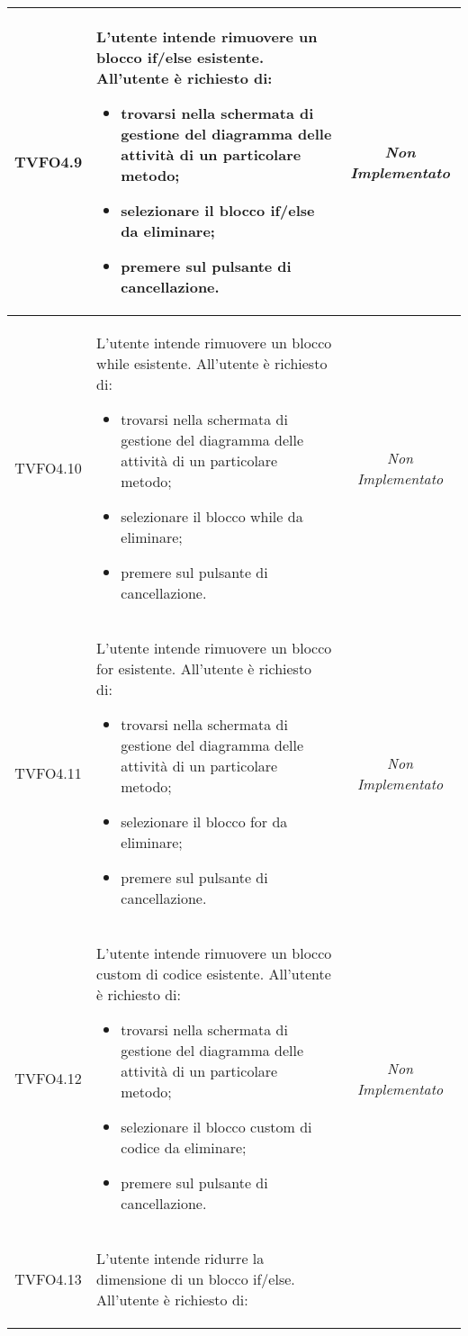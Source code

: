 \begin{longtable}{|c|>{}m{8cm}|c|}
\hypertarget{TVFO4.9}{TVFO4.9} & L'utente intende rimuovere un blocco if/else esistente.
All'utente è richiesto di:
\begin{itemize}
\item trovarsi nella schermata di gestione del diagramma delle attività di un particolare metodo;
\item selezionare il blocco if/else da eliminare;
\item premere sul pulsante di cancellazione.
\end{itemize} & \textit{Non Implementato}\\ \hline
\hypertarget{TVFO4.10}{TVFO4.10} & L'utente intende rimuovere un blocco while esistente.
All'utente è richiesto di:
\begin{itemize}
\item trovarsi nella schermata di gestione del diagramma delle attività di un particolare metodo;
\item selezionare il blocco while da eliminare;
\item premere sul pulsante di cancellazione.
\end{itemize} & \textit{Non Implementato}\\ \hline
\hypertarget{TVFO4.11}{TVFO4.11} & L'utente intende rimuovere un blocco for esistente.
All'utente è richiesto di:
\begin{itemize}
\item trovarsi nella schermata di gestione del diagramma delle attività di un particolare metodo;
\item selezionare il blocco for da eliminare;
\item premere sul pulsante di cancellazione.
\end{itemize} & \textit{Non Implementato}\\ \hline
\hypertarget{TVFO4.12}{TVFO4.12} & L'utente intende rimuovere un blocco custom di codice esistente.
All'utente è richiesto di:
\begin{itemize}
\item trovarsi nella schermata di gestione del diagramma delle attività di un particolare metodo;
\item selezionare il blocco custom di codice da eliminare;
\item premere sul pulsante di cancellazione.
\end{itemize} & \textit{Non Implementato}\\ \hline
\hypertarget{TVFO4.13}{TVFO4.13} & L'utente intende ridurre la dimensione di un blocco if/else.
All'utente è richiesto di:
\begin{itemize}

\end{itemize}
\end{longtable}
